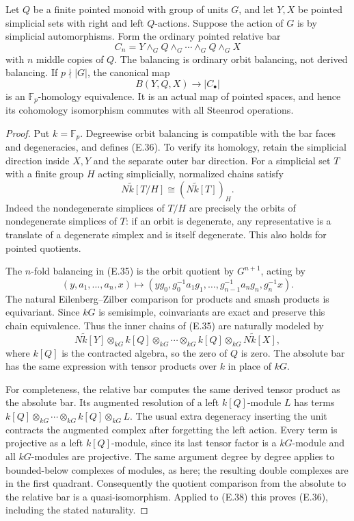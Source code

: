 \begin{lemma}\label{E:relative-bar-good-prime}
Let $Q$ be a finite pointed monoid with group of units $G$, and let
$Y,X$ be pointed simplicial sets with right and left $Q$-actions.
Suppose the action of $G$ is by simplicial automorphisms.  Form the
ordinary pointed relative bar
\[
 C_n=Y\wedge_G Q\wedge_G\cdots\wedge_G Q\wedge_G X
                                                               \tag{E.35}
\]
with $n$ middle copies of $Q$.  The balancing is ordinary orbit
balancing, not derived balancing.  If $p\nmid|G|$, the canonical map
\[
 B(Y,Q,X)\longrightarrow |C_\bullet|                  \tag{E.36}
\]
is an $\mathbb F_p$-homology equivalence.  It is an actual map of
pointed spaces, and hence its cohomology isomorphism commutes with
all Steenrod operations.
\end{lemma}

\begin{proof}
Put $k=\mathbb F_p$.  Degreewise orbit balancing is compatible with
the bar faces and degeneracies, and defines (E.36).  To verify its
homology, retain the simplicial direction inside $X,Y$ and the
separate outer bar direction.  For a simplicial set $T$ with a finite
group $H$ acting simplicially, normalized chains satisfy
\[
 N\widetilde k[T/H]\cong (N\widetilde k[T])_H.          \tag{E.37}
\]
Indeed the nondegenerate simplices of $T/H$ are precisely the orbits
of nondegenerate simplices of $T$: if an orbit is degenerate, any
representative is a translate of a degenerate simplex and is itself
degenerate.  This also holds for pointed quotients.

The $n$-fold balancing in (E.35) is the orbit quotient by $G^{n+1}$,
acting by
\[
 (y,a_1,\ldots,a_n,x)\longmapsto
 (yg_0,g_0^{-1}a_1g_1,\ldots,g_{n-1}^{-1}a_ng_n,g_n^{-1}x).
\]
The natural Eilenberg--Zilber comparison for products and smash
products is equivariant.  Since $kG$ is semisimple, coinvariants are
exact and preserve this chain equivalence.  Thus the inner chains
of (E.35) are naturally modeled by
\[
 N\widetilde k[Y]\otimes_{kG} k[Q]\otimes_{kG}\cdots
       \otimes_{kG} k[Q]\otimes_{kG}N\widetilde k[X],   \tag{E.38}
\]
where $k[Q]$ is the contracted algebra, so the zero of $Q$ is zero.
The absolute bar has the same expression with tensor products over
$k$ in place of $kG$.

For completeness, the relative bar computes the same derived tensor
product as the absolute bar.  Its augmented resolution of a left
$k[Q]$-module $L$ has terms
$k[Q]\otimes_{kG}\cdots\otimes_{kG} k[Q]\otimes_{kG}L$.
The usual extra degeneracy inserting the unit contracts the augmented
complex after forgetting the left action.  Every term is projective
as a left $k[Q]$-module, since its last tensor factor is a $kG$-module
and all $kG$-modules are projective.  The same argument degree by
degree applies to bounded-below complexes of modules, as here;
the resulting double complexes are in the first quadrant.
Consequently the quotient comparison from the absolute to the
relative bar is a quasi-isomorphism.  Applied to (E.38) this proves
(E.36), including the stated naturality.
\end{proof}

